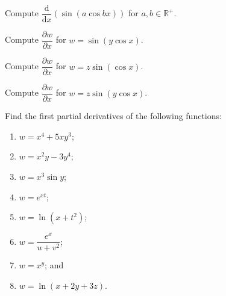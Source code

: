 \documentclass[11pt]{article}
\theoremstyle{break}
\newcommand{\differentiate}[1]{\dfrac{\dd}{\dd{#1}}}
\newcommand{\pderivative}[2]{\dfrac{\partial {#1}}{\partial {#2}}}
\newcommand{\dd}{\text{d}}
\newcommand{\bbR}{\mathbb{R}}
\numberwithin{equation}{theorem}
\begin{document}
\begin{example}
    Compute $\differentiate{x}\left(\sin\left(a\cos bx\right)\right)$ for $a, b\in\bbR^+$.
\end{example}
\vspace{8em}

\begin{example}
    Compute $\pderivative{w}{x}$ for $w=\sin\left(y\cos x\right)$.
\end{example}
\vspace{8em}

\begin{example}
    Compute $\pderivative{w}{x}$ for $w=z\sin\left(\cos x\right)$.
\end{example}
\vspace{8em}

\begin{example}
    Compute $\pderivative{w}{x}$ for $w=z\sin\left(y\cos x\right)$.
\end{example}
\vspace{8em}

\begin{question}
    Find the first partial derivatives of the following functions:
    \begin{enumerate}
        \item $w=x^4+5xy^3$;
        \item $w=x^2y-3y^4$;
        \item $w=x^3\sin y$;
        \item $w=e^{xt}$;
        \item $w=\ln(x+t^2)$;
        \item $w=\dfrac{e^x}{u+v^2}$;
        \item $w=x^y$; and
        \item $w=\ln(x+2y+3z)$.
    \end{enumerate}
\end{question}
\end{document}
